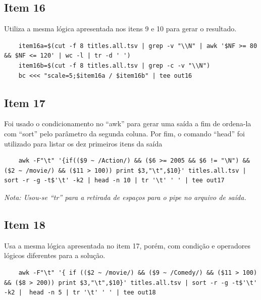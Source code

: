 \documentclass[12pt]{article}
\begin{document}
	\subsection*{Item 16}
	Utiliza a mesma lógica apresentada nos itens 9 e 10 para gerar o resultado.
	\begin{verbatim}
	item16a=$(cut -f 8 titles.all.tsv | grep -v "\\N" | awk '$NF >= 80 && $NF <= 120' | wc -l | tr -d ' ')
	item16b=$(cut -f 8 titles.all.tsv | grep -c -v "\\N")
	bc <<< "scale=5;$item16a / $item16b" | tee out16
	\end{verbatim}
	\subsection*{Item 17}
	Foi usado o condicionamento no ``awk'' para gerar uma saída a fim de ordena-la com ``sort'' pelo parâmetro da segunda coluna. Por fim, o comando ``head'' foi utilizado para listar os dez primeiros itens da saída 
	\begin{verbatim}
	awk -F"\t" '{if(($9 ~ /Action/) && ($6 >= 2005 && $6 != "\N") && ($2 ~ /movie/) && ($11 > 100)) print $3,"\t",$10}' titles.all.tsv | sort -r -g -t$'\t' -k2 | head -n 10 | tr '\t' ' ' | tee out17
	\end{verbatim}
	\textit{Nota: Usou-se ``tr'' para a retirada de espaços para o pipe no arquivo de saída.}
	\subsection*{Item 18}
	Usa a mesma lógica apresentada no item 17, porém, com condição e operadores lógicos diferentes para a solução.
	\begin{verbatim}
	awk -F"\t" '{ if (($2 ~ /movie/) && ($9 ~ /Comedy/) && ($11 > 100) && ($8 > 200)) print $3,"\t",$10}' titles.all.tsv | sort -r -g -t$'\t' -k2 |  head -n 5 | tr '\t' ' ' | tee out18
	\end{verbatim}
\end{document}
